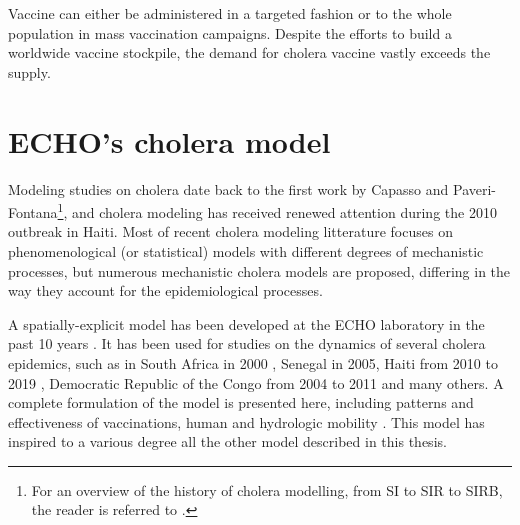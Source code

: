  Vaccine can either be administered in a targeted fashion or to the whole population in mass vaccination campaigns. Despite the efforts to build a worldwide vaccine stockpile, the demand for cholera vaccine vastly exceeds the supply\cite[-1\baselineskip]{Parker:AdaptingGlobalShortage:2017a,Seidlein:PreventingCholeraOutbreaks:2018}.

\section{ECHO's cholera model}

Modeling studies on cholera date back to the first work by Capasso and Paveri-Fontana\cite{Capasso:MathematicalModel1973:1979}\footnote{For an overview of the history of cholera modelling, from SI to SIR to SIRB, the reader is referred to .}, and cholera modeling has received renewed attention during the 2010 outbreak in Haiti. Most of recent cholera modeling litterature focuses on phenomenological (or statistical) models with different degrees of mechanistic processes, but numerous mechanistic cholera models are proposed, differing in the way they account for the epidemiological processes. %


A spatially-explicit model has been developed at the ECHO laboratory in the past 10 years \parencite{Bertuzzo:SpacetimeEvolutionCholera:2008}. It has been used for studies on the dynamics of several cholera epidemics, such as in South Africa in 2000 \parencite{Mari:ModellingCholeraEpidemics:2012}, Senegal in 2005, Haiti from 2010 to 2019 \parencite{Bertuzzo:PredictionSpatialEvolution:2011,Bertuzzo:ProbabilityExtinctionHaiti:2016}, Democratic Republic of the Congo from 2004 to 2011 and many others\parencite{Finger:PotentialImpactCasearea:2018}.  
A complete formulation of the model is presented here, including patterns and effectiveness of vaccinations, human and hydrologic mobility \parencite{Bertuzzo:ProbabilityExtinctionHaiti:2016,Pasetto:RealtimeForecastingCholera:2018}. This model has inspired to a various degree all the other model described in this thesis.

